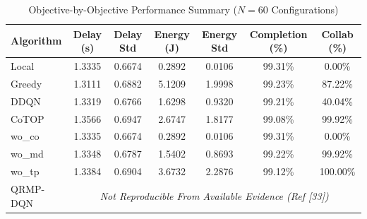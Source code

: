 \begin{table}[htbp]
\centering
\caption{Objective-by-Objective Performance Summary ($N=60$ Configurations)}
\label{tab:objective_performance}
\begin{tabular}{lcccccc}
\hline
Algorithm & Delay (s) & Delay Std & Energy (J) & Energy Std & Completion (\%) & Collab (\%) \\
\hline
Local & 1.3335 & 0.6674 & 0.2892 & 0.0106 & 99.31\% & 0.00\% \\
Greedy & 1.3111 & 0.6882 & 5.1209 & 1.9998 & 99.23\% & 87.22\% \\
DDQN & 1.3319 & 0.6766 & 1.6298 & 0.9320 & 99.21\% & 40.04\% \\
CoTOP & 1.3566 & 0.6947 & 2.6747 & 1.8177 & 99.08\% & 99.92\% \\
wo_co & 1.3335 & 0.6674 & 0.2892 & 0.0106 & 99.31\% & 0.00\% \\
wo_md & 1.3348 & 0.6787 & 1.5402 & 0.8693 & 99.22\% & 99.92\% \\
wo_tp & 1.3384 & 0.6904 & 3.6732 & 2.2876 & 99.12\% & 100.00\% \\
QRMP-DQN & \multicolumn{6}{c}{\textit{Not Reproducible From Available Evidence (Ref [33])}} \\
\hline
\end{tabular}
\end{table}
